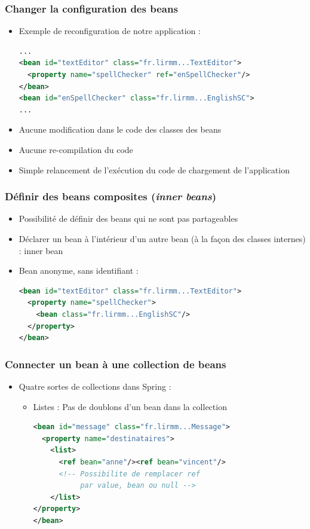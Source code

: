 \documentclass{beamer}
\begin{document}
\begin{frame}[fragile]
  \frametitle{Changer la configuration des beans}
  \begin{itemize}
  \item Exemple de reconfiguration de notre application :
\begin{lstlisting}[language=XML,basicstyle=\scriptsize]    
...
<bean id="textEditor" class="fr.lirmm...TextEditor">
  <property name="spellChecker" ref="enSpellChecker"/>
</bean>
<bean id="enSpellChecker" class="fr.lirmm...EnglishSC">
...
\end{lstlisting}
\item Aucune modification dans le code des classes des beans
\item Aucune re-compilation du code
\item Simple relancement de l'exécution du code de chargement
de l'application
\end{itemize}
\end{frame}

\begin{frame}[fragile]
  \frametitle{Définir des beans composites (\textit{inner beans})}
  \begin{itemize}
  \item Possibilité de définir des beans qui ne sont pas partageables
  \item Déclarer un bean à l'intérieur d'un autre bean (à la façon
des classes internes) : inner bean
\item Bean anonyme, sans identifiant :
\begin{lstlisting}[language=XML,basicstyle=\scriptsize]      
<bean id="textEditor" class="fr.lirmm...TextEditor">
  <property name="spellChecker">
    <bean class="fr.lirmm...EnglishSC"/>
  </property>
</bean>
\end{lstlisting}
\end{itemize}
\end{frame}

\begin{frame}[fragile]
  \frametitle{Connecter un bean à une collection de beans}
  \begin{itemize}
  \item Quatre sortes de collections dans Spring :
  \begin{itemize}
  \item Listes : Pas de doublons d'un bean dans la collection
\begin{lstlisting}[language=XML,basicstyle=\scriptsize]    
<bean id="message" class="fr.lirmm...Message">
  <property name="destinataires">
    <list>
      <ref bean="anne"/><ref bean="vincent"/>
      <!-- Possibilite de remplacer ref
           par value, bean ou null -->
    </list>
</property>
</bean>
\end{lstlisting}
\end{itemize}
\end{itemize}
\end{frame}
\end{document}
